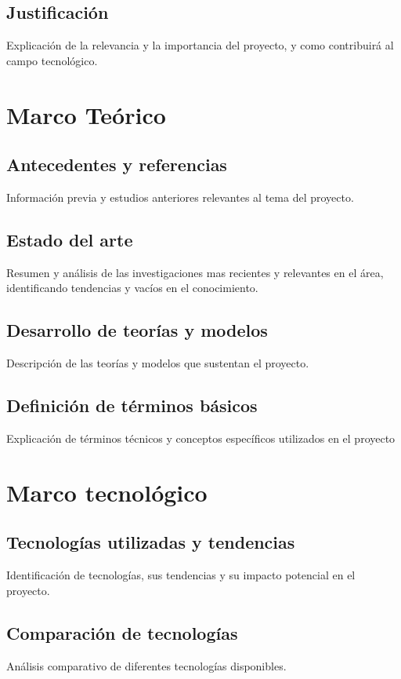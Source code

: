 \documentclass[12pt,letterpaper]{report}
\begin{document}
	\subsection{Justificación}
	Explicación de la relevancia y la importancia del proyecto, y como contribuirá al campo tecnológico.
	
	\newpage
	\section{Marco Teórico}
	\subsection{Antecedentes y referencias}
	Información previa y estudios anteriores relevantes al tema del proyecto.
	\subsection{Estado del arte}
	Resumen y análisis de las investigaciones mas recientes y relevantes en el área, identificando tendencias y vacíos en el conocimiento.
	\subsection{Desarrollo de teorías y modelos}
	Descripción de las teorías y modelos que sustentan el proyecto.
	\subsection{Definición de términos básicos}
	Explicación de términos técnicos y conceptos específicos utilizados en el proyecto
	
	\newpage
	\section{Marco tecnológico}
	
	\subsection{Tecnologías utilizadas y tendencias}
	Identificación de tecnologías, sus tendencias y su impacto potencial en el proyecto.
	
	\subsection{Comparación de tecnologías}
	Análisis comparativo de diferentes tecnologías disponibles.
	
\end{document}
